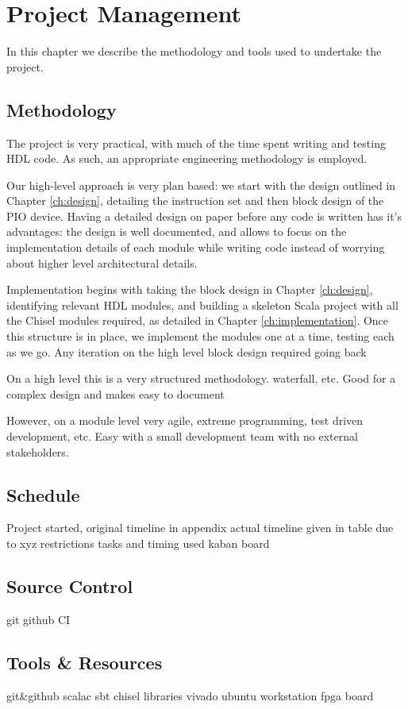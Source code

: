 \chapter{Project Management}

In this chapter we describe the methodology and tools used to undertake the project.

\section{Methodology}
The project is very practical, with much of the time spent writing and testing HDL code. As such, an appropriate engineering methodology is employed.

Our high-level approach is very plan based: we start with the design outlined in Chapter \ref{ch:design}, detailing the instruction set and then block design of the PIO device. Having a detailed design on paper before any code is written has it's advantages: the design is well documented, and allows to focus on the implementation details of each module while writing code instead of worrying about higher level architectural details.

Implementation begins with taking the block design in Chapter \ref{ch:design}, identifying relevant HDL modules, and building a skeleton Scala project with all the Chisel modules required, as detailed in Chapter \ref{ch:implementation}. Once this structure is in place, we implement the modules one at a time, testing each as we go. Any iteration on the high level block design required going back

On a high level this is a very structured methodology. waterfall, etc. Good for a complex design and makes easy to document

However, on a module level very agile, extreme programming, test driven development, etc. Easy with a small development team with no external stakeholders.

\section{Schedule}
Project started, original timeline in appendix
actual timeline given in table 
due to xyz restrictions
tasks and timing used kaban board 
\section{Source Control}
git 
github 
CI


\section{Tools \& Resources}
git&github
scalac
sbt
chisel libraries
vivado
ubuntu workstation
fpga board